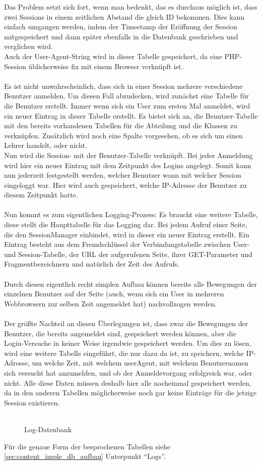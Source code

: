 Das Problem setzt sich fort, wenn man bedenkt, das es durchaus möglich ist, dass zwei Sessions in einem zeitlichen Abstand die gleich ID bekommen. Dies kann einfach umgangen werden, indem der Timestamp der Eröffnung der Session mitgespeichert und dann später ebenfalls in die Datenbank geschrieben und verglichen wird.\\
Auch der User-Agent-String wird in dieser Tabelle gespeichert, da eine PHP-Session üblicherweise fix mit einem Browser verknüpft ist.\\
\\
Es ist nicht unwahrscheinlich, dass sich in einer Session mehrere verschiedene Benutzer anmelden. Um diesen Fall abzudecken, wird zunächst eine Tabelle für die Benutzer erstellt. Immer wenn sich ein User zum ersten Mal anmeldet, wird ein neuer Eintrag in dieser Tabelle erstellt. Es bietet sich an, die Benutzer-Tabelle mit den bereits vorhandenen Tabellen für die Abteilung und die Klassen zu verknüpfen. Zusätzlich wird noch eine Spalte vorgesehen, ob es sich um einen Lehrer handelt, oder nicht.\\
Nun wird die Session- mit der Benutzer-Tabelle verknüpft. Bei jeder Anmeldung wird hier ein neuer Eintrag mit dem Zeitpunkt des Logins angelegt. Somit kann nun jederzeit festgestellt werden, welcher Benutzer wann mit welcher Session eingeloggt war. Hier wird auch gespeichert, welche IP-Adresse der Benutzer zu diesem Zeitpunkt hatte.\\
\\
Nun kommt es zum eigentlichen Logging-Prozess: Es braucht eine weitere Tabelle, diese stellt die Haupttabelle für das Logging dar. Bei jedem Aufruf einer Seite, die den SessionManager einbindet, wird in dieser ein neuer Eintrag erstellt. Ein Eintrag besteht aus dem Fremdschlüssel der Verbindungstabelle zwischen User- und Session-Tabelle, der URL der aufgerufenen Seite, ihrer GET-Parameter und Fragmentbezeichnern und natürlich der Zeit des Aufrufs.\\
\\
Durch diesen eigentlich recht simplen Aufbau können bereits alle Bewegungen der einzelnen Benutzer auf der Seite (auch, wenn sich ein User in mehreren Webbrowsern zur selben Zeit angemeldet hat) nachvollzogen werden.\\
\\
Der größte Nachteil an diesen Überlegungen ist, dass zwar die Bewegungen der Benutzer, die bereits angemeldet sind, gespeichert werden können, aber die Login-Versuche in keiner Weise irgendwie gespeichert werden. Um dies zu lösen, wird eine weitere Tabelle eingeführt, die nur dazu da ist, zu speichern, welche IP-Adresse, um welche Zeit, mit welchem userAgent, mit welchem Benutzernamen sich versucht hat anzumelden, und ob der Anmeldevorgang erfolgreich war, oder nicht. Alle diese Daten müssen deshalb hier alle nocheinmal gespeichert werden, da in den anderen Tabellen möglicherweise noch gar keine Einträge für die jetzige Session existieren.\\
\\
\begin{figure}[H]
\centering
{}
\caption{Log-Datenbank}
\end{figure}
Für die genaue Form der besprochenen Tabellen siehe \autoref{sec:content_imple_db_aufbau} Unterpunkt \enquote{Logs}.
 

